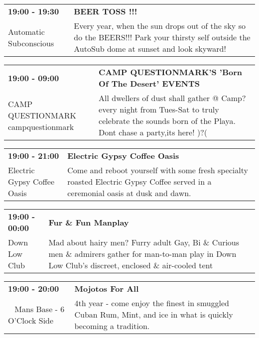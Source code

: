 \begin{tabular}{ p{1in} p{2.2in} }
    \textbf{19:00 - 19:30} & \textbf{BEER TOSS !!!} \\
    Automatic Subconscious \newline  & Every year, when the sun drops out of the sky so do the BEERS!!! Park your thirsty self outside the AutoSub dome at sunset and look skyward! \\
    \hline 
\end{tabular}
    
\begin{tabular}{ p{1in} p{2.2in} }
    \textbf{19:00 - 09:00} & \textbf{CAMP QUESTIONMARK'S 'Born Of The Desert' EVENTS  } \\
    CAMP QUESTIONMARK \newline campquestionmark & All dwellers of dust shall gather @ Camp? every night from Tues-Sat to truly celebrate the sounds born of the Playa. Dont chase a party,its here!
)?( \\
    \hline 
\end{tabular}
    
\begin{tabular}{ p{1in} p{2.2in} }
    \textbf{19:00 - 21:00} & \textbf{Electric Gypsy Coffee Oasis} \\
    Electric Gypsy Coffee Oasis \newline  & Come and reboot yourself with some fresh specialty roasted Electric Gypsy Coffee served in a ceremonial oasis at dusk and dawn. \\
    \hline 
\end{tabular}
    
\begin{tabular}{ p{1in} p{2.2in} }
    \textbf{19:00 - 00:00} & \textbf{Fur \& Fun Manplay} \\
    Down Low Club \newline  & Mad about hairy men? Furry adult Gay, Bi \& Curious men \& admirers gather for man-to-man play in Down Low Club's discreet, enclosed \& air-cooled tent \\
    \hline 
\end{tabular}
    
\begin{tabular}{ p{1in} p{2.2in} }
    \textbf{19:00 - 20:00} & \textbf{Mojotos For All} \\
    ~ \newline Mans Base - 6 O'Clock Side & 4th year - come enjoy the finest in smuggled Cuban Rum, Mint, and ice in what is quickly becoming a tradition. \\
    \hline 
\end{tabular}
    
